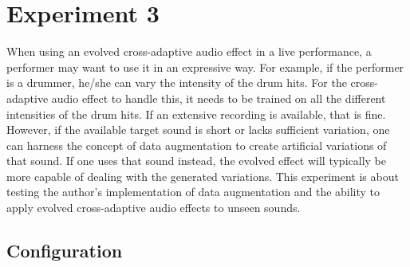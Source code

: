 \section{Experiment 3}
When using an evolved cross-adaptive audio effect in a live performance, a performer may want to use it in an expressive way. For example, if the performer is a drummer, he/she can vary the intensity of the drum hits. For the cross-adaptive audio effect to handle this, it needs to be trained on all the different intensities of the drum hits. If an extensive recording is available, that is fine. However, if the available target sound is short or lacks sufficient variation, one can harness the concept of data augmentation to create artificial variations of that sound. If one uses that sound instead, the evolved effect will typically be more capable of dealing with the generated variations. This experiment is about testing the author's implementation of data augmentation and the ability to apply evolved cross-adaptive audio effects to unseen sounds.

\subsection{Configuration}

